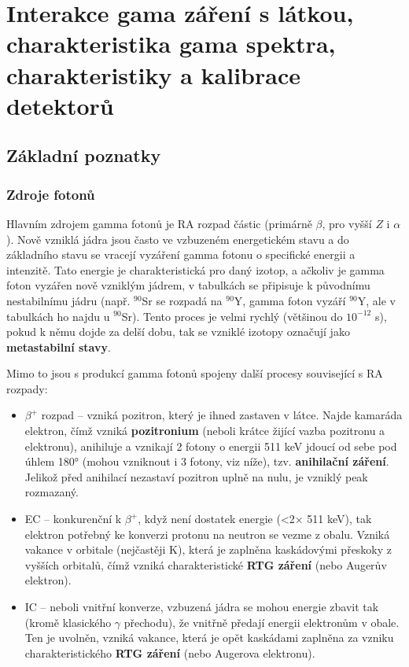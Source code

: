 \section[Interakce gamma záření]{Interakce gama záření s látkou, charakteristika gama spektra, charakteristiky a kalibrace detektorů}

\subsection{Základní poznatky}

\subsubsection{Zdroje fotonů}

Hlavním zdrojem gamma fotonů je RA rozpad částic (primárně $\beta$, pro vyšší $Z$ i $\alpha$). Nově vzniklá jádra jsou často ve vzbuzeném energetickém stavu a do základního stavu se vracejí vyzáření gamma fotonu o specifické energii a intenzitě. Tato energie je charakteristická pro daný izotop, a ačkoliv je gamma foton vyzářen nově vzniklým jádrem, v tabulkách se připisuje k původnímu nestabilnímu jádru (např. $^{90}$Sr se rozpadá na $^{90}$Y, gamma foton vyzáří $^{90}$Y, ale v tabulkách ho najdu u $^{90}$Sr). Tento proces je velmi rychlý (většinou do $10^{-12}$ s), pokud k němu dojde za delší dobu, tak se vzniklé izotopy označují jako \textbf{metastabilní stavy}.

Mimo to jsou s produkcí gamma fotonů spojeny další procesy související s RA rozpady:

\begin{itemize}
    \item $\beta^+$ rozpad -- vzniká pozitron, který je ihned zastaven v látce. Najde kamaráda elektron, čímž vzniká \textbf{pozitronium} (neboli krátce žijící vazba pozitronu a elektronu), anihiluje a vznikají 2 fotony o energii 511 keV jdoucí od sebe pod úhlem 180° (mohou vzniknout i 3 fotony, viz níže), tzv. \textbf{anihilační záření}. Jelikož před anihilací nezastaví pozitron uplně na nulu, je vzniklý peak rozmazaný.
    \item EC -- konkurenční k $\beta^+$, když není dostatek energie (<2$\times$ 511 keV), tak elektron potřebný ke konverzi protonu na neutron se vezme z obalu. Vzniká vakance v orbitale (nejčastěji K), která je zaplněna kaskádovými přeskoky z vyšších orbitalů, čímž vzniká charakteristické \textbf{RTG záření} (nebo Augerův elektron).
    \item IC -- neboli vnitřní konverze, vzbuzená jádra se mohou energie zbavit tak (kromě klasického $\gamma$ přechodu), že vnitřně předají energii elektronům v obale. Ten je uvolněn, vzniká vakance, která je opět kaskádami zaplněna za vzniku charakteristického \textbf{RTG záření} (nebo Augerova elektronu).
\end{itemize}

